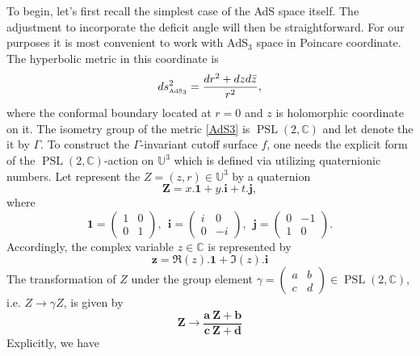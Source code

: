 \documentclass[a4paper,11pt]{article}
\newcommand{\PSLC}{\operatorname{PSL}(2,\mathbb{C})}
\begin{document}
To begin, let's first recall the simplest case of the AdS space itself. The adjustment to incorporate the deficit angle will then be straightforward. For our purposes it is most convenient to work with $\text{AdS}_3$ space in Poincare coordinate. The hyperbolic metric in this coordinate is 
\begin{equation}
	\begin{aligned}
		ds^2_{\text{\tiny AdS}_3} = \frac{dr^2 + dz d\bar{z}}{r^2},
	\end{aligned}\label{AdS3}
\end{equation}
where the conformal boundary located at $r=0$ and $z$ is holomorphic coordinate on it. The isometry group of the metric \eqref{AdS3} is $\PSLC$ and let denote the it by $\Gamma$. To construct the $\Gamma$-invariant cutoff surface $f$, one needs the explicit form of the $\PSLC$-action on $\mathbb{U}^3$ which is defined via utilizing quaternionic numbers. Let represent the $Z =(z,r) \in \mathbb{U}^3$ by a quaternion 
\begin{equation}
\mathbf{Z} = x.\mathbf{1} + y.\mathbf{i}+t.\mathbf{j},
\end{equation}
where 
\begin{equation}
\mathbf{1} = \begin{pmatrix}
1 & 0 \\
0 & 1 
\end{pmatrix},~~\mathbf{i} = \begin{pmatrix}
i & 0 \\
0 & -i 
\end{pmatrix},~~\mathbf{j} = \begin{pmatrix}
0 & -1 \\
1 & 0 
\end{pmatrix}.
\end{equation}
Accordingly, the complex variable $z\in \mathbb{C}$ is represented by
\begin{equation}
\mathbf{z} = \Re(z).\mathbf{1}+\Im(z).\mathbf{i} 
\end{equation}
The transformation of $Z$ under the group element $\gamma = \begin{pmatrix}
a & b \\
c & d 
\end{pmatrix}\in \PSLC$, i.e. $Z\rightarrow \gamma Z$, is given by
\begin{equation}
\mathbf{Z} \rightarrow  \frac{\mathbf{a}~\mathbf{Z} + \mathbf{b}}{\mathbf{c}~\mathbf{Z}+\mathbf{d}}
\end{equation}
Explicitly, we have
\end{document}
